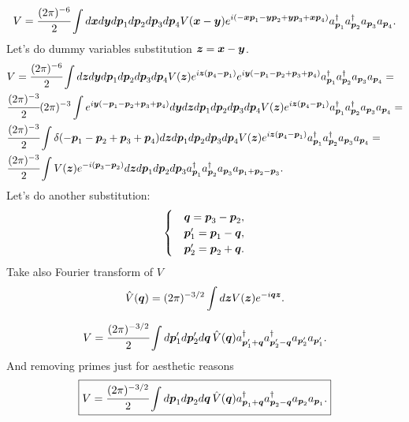 \documentclass[main.tex]{subfiles}
\begin{document}
\begin{align*}
V = \cfrac{(2\pi)^{-6}}{2} \int d\boldsymbol{x} d\boldsymbol{y} d\boldsymbol{p}_1 d\boldsymbol{p}_2 d\boldsymbol{p}_3 d\boldsymbol{p}_4
V(\boldsymbol{x} - \boldsymbol{y}) e^{i(-\boldsymbol{x}\boldsymbol{p}_1 -\boldsymbol{y}\boldsymbol{p}_2 + \boldsymbol{y}\boldsymbol{p}_3 +\boldsymbol{x}\boldsymbol{p}_4)}
a^\dagger_{\boldsymbol{p}_1} a^\dagger_{\boldsymbol{p}_2} a_{\boldsymbol{p}_3} a_{\boldsymbol{p}_4}.
\end{align*}
Let's do dummy variables substitution $\boldsymbol{z} = \boldsymbol{x} - \boldsymbol{y}$.
\begin{align*}
& V =  \cfrac{(2\pi)^{-6}}{2} \int d\boldsymbol{z} d\boldsymbol{y} d\boldsymbol{p}_1 d\boldsymbol{p}_2 d\boldsymbol{p}_3 d\boldsymbol{p}_4
V(\boldsymbol{z}) e^{i\boldsymbol{z}(\boldsymbol{p}_4 - \boldsymbol{p}_1)} e^{i\boldsymbol{y} (-\boldsymbol{p}_1 - \boldsymbol{p}_2 + \boldsymbol{p}_3 + \boldsymbol{p}_4)}
a^\dagger_{\boldsymbol{p}_1} a^\dagger_{\boldsymbol{p}_2} a_{\boldsymbol{p}_3} a_{\boldsymbol{p}_4} = \\
& \cfrac{(2\pi)^{-3}}{2} (2\pi)^{-3}
 \int  e^{i\boldsymbol{y} (-\boldsymbol{p}_1 - \boldsymbol{p}_2 + \boldsymbol{p}_3 + \boldsymbol{p}_4)} d\boldsymbol{y}  d\boldsymbol{z}  d\boldsymbol{p}_1 d\boldsymbol{p}_2 d\boldsymbol{p}_3 d\boldsymbol{p}_4
V(\boldsymbol{z}) e^{i\boldsymbol{z}(\boldsymbol{p}_4 - \boldsymbol{p}_1)} 
a^\dagger_{\boldsymbol{p}_1} a^\dagger_{\boldsymbol{p}_2} a_{\boldsymbol{p}_3} a_{\boldsymbol{p}_4} = \\
& \cfrac{(2\pi)^{-3}}{2} \int \delta(-\boldsymbol{p}_1 - \boldsymbol{p}_2 + \boldsymbol{p}_3 + \boldsymbol{p}_4) d\boldsymbol{z}  d\boldsymbol{p}_1 d\boldsymbol{p}_2 d\boldsymbol{p}_3 d\boldsymbol{p}_4
V(\boldsymbol{z}) e^{i\boldsymbol{z}(\boldsymbol{p}_4 - \boldsymbol{p}_1)} 
a^\dagger_{\boldsymbol{p}_1} a^\dagger_{\boldsymbol{p}_2} a_{\boldsymbol{p}_3} a_{\boldsymbol{p}_4} = \\
& \cfrac{(2\pi)^{-3}}{2} \int V(\boldsymbol{z}) e^{-i(\boldsymbol{p}_3 - \boldsymbol{p}_2)} d\boldsymbol{z}  d\boldsymbol{p}_1 d\boldsymbol{p}_2 d\boldsymbol{p}_3
a^\dagger_{\boldsymbol{p}_1} a^\dagger_{\boldsymbol{p}_2} a_{\boldsymbol{p}_3} a_{\boldsymbol{p}_1 + \boldsymbol{p}_2 - \boldsymbol{p}_3}.
\end{align*}
Let's do another substitution:
\begin{equation}
\begin{cases}
& \boldsymbol{q} = \boldsymbol{p}_3 - \boldsymbol{p}_2, \\
& \boldsymbol{p}'_1 = \boldsymbol{p}_1 - \boldsymbol{q}, \\
&  \boldsymbol{p}'_2 = \boldsymbol{p}_2 + \boldsymbol{q}.
\end{cases}
\end{equation}
Take also Fourier transform of $V$
\begin{equation}
\hat{V}(\boldsymbol{q}) = (2\pi)^{-3/2} \int d\boldsymbol{z} V(\boldsymbol{z}) e^{-i\boldsymbol{q}\boldsymbol{z}}. 
\end{equation}

\begin{equation}
V = \cfrac{(2\pi)^{-3/2}}{2} \int d\boldsymbol{p}'_1 d\boldsymbol{p}'_2 d\boldsymbol{q}\, \hat{V}(\boldsymbol{q})
a^\dagger_{\boldsymbol{p}'_1 + \boldsymbol{q}}
a^\dagger_{\boldsymbol{p}'_2 - \boldsymbol{q}}
a_{\boldsymbol{p}'_2}
a_{\boldsymbol{p}'_1}.
\end{equation}
And removing primes just for aesthetic reasons
\begin{equation}
\boxed{
V = \cfrac{(2\pi)^{-3/2}}{2} \int d\boldsymbol{p}_1 d\boldsymbol{p}_2 d\boldsymbol{q}\, \hat{V}(\boldsymbol{q})
a^\dagger_{\boldsymbol{p}_1 + \boldsymbol{q}}
a^\dagger_{\boldsymbol{p}_2 - \boldsymbol{q}}
a_{\boldsymbol{p}_2}
a_{\boldsymbol{p}_1}.
}
\end{equation}
\end{document}

